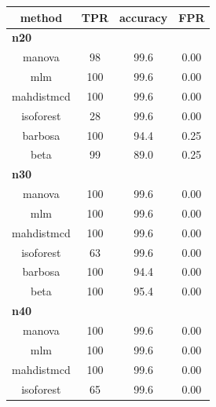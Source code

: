 \documentclass[
]{article}
\begin{document}
\begin{table}
\centering
\begin{tabular}[t]{c|c|c|c}
\hline
method & TPR & accuracy & FPR\\
\hline
\multicolumn{4}{l}{\textbf{n20}}\\
\hline
\hspace{1em}manova & 98 & 99.6 & 0.00\\
\hline
\hspace{1em}mlm & 100 & 99.6 & \vphantom{8} 0.00\\
\hline
\hspace{1em}mahdistmcd & 100 & 99.6 & \vphantom{8} 0.00\\
\hline
\hspace{1em}isoforest & 28 & 99.6 & 0.00\\
\hline
\hspace{1em}barbosa & 100 & 94.4 & 0.25\\
\hline
\hspace{1em}beta & 99 & 89.0 & 0.25\\
\hline
\multicolumn{4}{l}{\textbf{n30}}\\
\hline
\hspace{1em}manova & 100 & 99.6 & \vphantom{7} 0.00\\
\hline
\hspace{1em}mlm & 100 & 99.6 & \vphantom{7} 0.00\\
\hline
\hspace{1em}mahdistmcd & 100 & 99.6 & \vphantom{7} 0.00\\
\hline
\hspace{1em}isoforest & 63 & 99.6 & 0.00\\
\hline
\hspace{1em}barbosa & 100 & 94.4 & 0.00\\
\hline
\hspace{1em}beta & 100 & 95.4 & 0.00\\
\hline
\multicolumn{4}{l}{\textbf{n40}}\\
\hline
\hspace{1em}manova & 100 & 99.6 & \vphantom{6} 0.00\\
\hline
\hspace{1em}mlm & 100 & 99.6 & \vphantom{6} 0.00\\
\hline
\hspace{1em}mahdistmcd & 100 & 99.6 & \vphantom{6} 0.00\\
\hline
\hspace{1em}isoforest & 65 & 99.6 & 0.00\\

\end{tabular}
\end{table}
\end{document}
